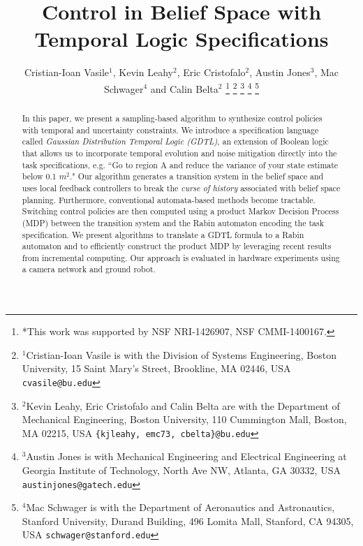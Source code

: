 \documentclass[letterpaper, 10 pt, conference]{ieeeconf}  %
\title{\LARGE \bf
Control in Belief Space with Temporal Logic Specifications
}
\author{Cristian-Ioan Vasile$^{1}$, Kevin Leahy$^{2}$, Eric Cristofalo$^{2}$, Austin Jones$^{3}$, Mac Schwager$^{4}$ and Calin Belta$^{2}$
\thanks{*This work was supported by NSF NRI-1426907, NSF CMMI-1400167.}%
\thanks{$^{1}$Cristian-Ioan Vasile is with the Division of Systems Engineering,
    Boston University, 15 Saint Mary's Street, Brookline, MA 02446, USA
    {\tt\small cvasile@bu.edu}
}%
\thanks{$^{2}$Kevin Leahy, Eric Cristofalo and Calin Belta are with the
    Department of Mechanical Engineering, Boston University,
    110 Cummington Mall, Boston, MA 02215, USA
    {\tt\small \{kjleahy, emc73, cbelta\}@bu.edu}
}%
\thanks{$^{3}$Austin Jones is with Mechanical Engineering and
    Electrical Engineering at Georgia Institute of Technology, North Ave NW, Atlanta, GA 30332, USA 
    {\tt\small austinjones@gatech.edu}}
%
\thanks{$^{4}$Mac Schwager is with the
    Department of Aeronautics and Astronautics, Stanford University,
    Durand Building, 496 Lomita Mall,  Stanford, CA 94305, USA
    {\tt\small schwager@stanford.edu}
}%
}
\begin{document}
\maketitle
\thispagestyle{empty}
\pagestyle{empty}



\begin{abstract}
In this paper, we present a sampling-based algorithm
to synthesize control policies with temporal and
uncertainty constraints.
We introduce a specification language called
{\em Gaussian Distribution Temporal Logic (GDTL)},
an extension of Boolean logic that allows us to incorporate
temporal evolution and noise mitigation directly into the task
specifications,
e.g. ``Go to region A and reduce the variance of your state
estimate below 0.1 $m^2$."
Our algorithm generates a transition system in the belief space
and uses local feedback controllers to break the {\em curse of history}
associated with belief space planning.
Furthermore, conventional automata-based methods become tractable.
Switching control policies are then computed using a product
Markov Decision Process (MDP) between
the transition system and the Rabin automaton encoding 
the task specification.
We present algorithms to translate a GDTL formula to a Rabin
automaton and to efficiently construct the product MDP
by leveraging recent results from incremental computing.
Our approach is evaluated in hardware experiments using
a camera network and ground robot.
\end{abstract}




%







%


\end{document}

